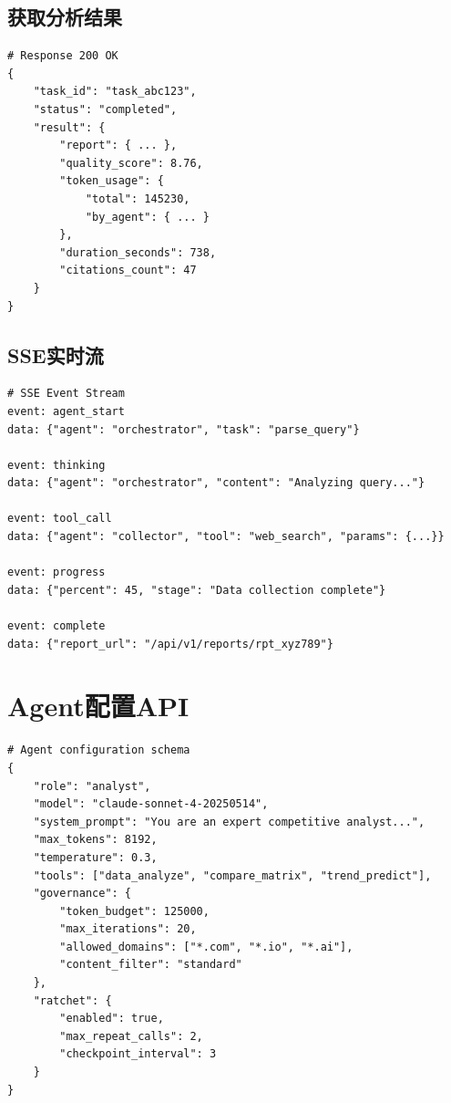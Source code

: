 \documentclass[12pt,a4paper]{ctexrep}
\begin{document}
\subsection{获取分析结果}

\begin{lstlisting}[language=Python3,caption=GET /api/v1/analysis/{task\_id}]
# Response 200 OK
{
    "task_id": "task_abc123",
    "status": "completed",
    "result": {
        "report": { ... },
        "quality_score": 8.76,
        "token_usage": {
            "total": 145230,
            "by_agent": { ... }
        },
        "duration_seconds": 738,
        "citations_count": 47
    }
}
\end{lstlisting}

\subsection{SSE实时流}

\begin{lstlisting}[language=Python3,caption=GET /api/v1/analysis/{task\_id}/stream]
# SSE Event Stream
event: agent_start
data: {"agent": "orchestrator", "task": "parse_query"}

event: thinking
data: {"agent": "orchestrator", "content": "Analyzing query..."}

event: tool_call
data: {"agent": "collector", "tool": "web_search", "params": {...}}

event: progress
data: {"percent": 45, "stage": "Data collection complete"}

event: complete
data: {"report_url": "/api/v1/reports/rpt_xyz789"}
\end{lstlisting}

\section{Agent配置API}

\begin{lstlisting}[language=Python3,caption=Agent配置Schema]
# Agent configuration schema
{
    "role": "analyst",
    "model": "claude-sonnet-4-20250514",
    "system_prompt": "You are an expert competitive analyst...",
    "max_tokens": 8192,
    "temperature": 0.3,
    "tools": ["data_analyze", "compare_matrix", "trend_predict"],
    "governance": {
        "token_budget": 125000,
        "max_iterations": 20,
        "allowed_domains": ["*.com", "*.io", "*.ai"],
        "content_filter": "standard"
    },
    "ratchet": {
        "enabled": true,
        "max_repeat_calls": 2,
        "checkpoint_interval": 3
    }
}
\end{lstlisting}
\end{document}
